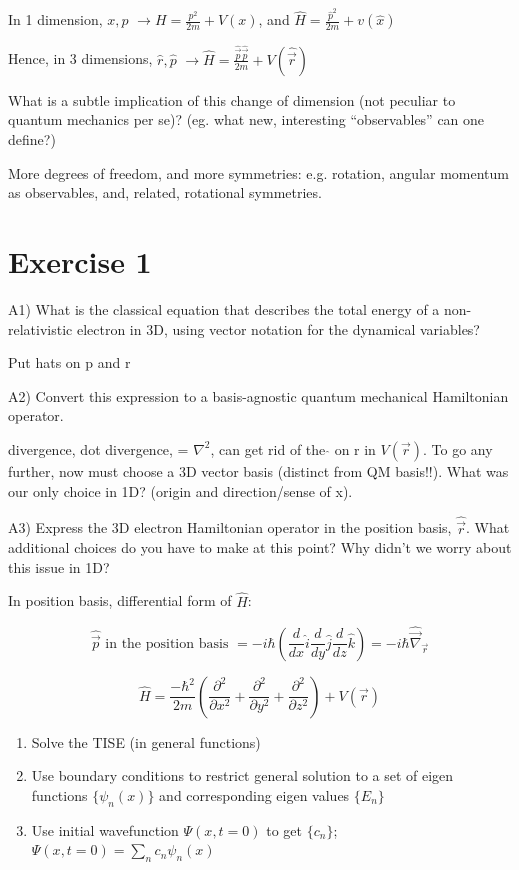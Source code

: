 \documentclass{article}
\begin{document}

In 1 dimension, $x,p$ $\longrightarrow H = \frac{p^2}{2m} + V(x)$, and $\hat{H} = \frac{\hat{p}^2}{2m} + v(\hat{x})$

Hence, in 3 dimensions, $\hat{r}, \hat{p}$ $\longrightarrow \hat{H} = \frac{\hat{\vec{p}} \hat{\vec{p}}}{2m} + V(\hat{\vec{r}})$

What is a subtle implication of this change of dimension (not peculiar to quantum mechanics per se)?  (eg. what new, interesting “observables” can one define?)

More degrees of freedom, and more symmetries: e.g. rotation, angular momentum as observables, and, related, rotational symmetries.  


\section{Exercise 1}

A1) What is the classical equation that describes the total energy of a non-relativistic electron in 3D, using vector notation for the dynamical variables?

Put hats on p and r


A2) Convert this expression to a basis-agnostic quantum mechanical Hamiltonian operator.

divergence, dot divergence, = $\nabla^2$, can get rid of the  $\hat{}$ on r in $V(\vec r)$.  To go any further, now must choose a 3D vector basis (distinct from QM basis!!).  What was our only choice in 1D?  (origin and direction/sense of x).

A3) Express the 3D electron Hamiltonian operator in the position basis, $\hat{\vec{r}}$.  What additional choices do you have to make at this point?  Why didn't we worry about this issue in 1D?

In position basis, differential form of $\hat{H}$:

$$\hat{\vec{p}} \text{ in the position basis } = -i \hbar \left( \frac{d}{dx} \hat{i} \frac{d}{dy} \hat{j} \frac{d}{dz} \hat{k} \right) = -i \hbar \hat{\vec{\nabla}}_{\vec{r}}$$

$$\hat{H} = \frac{-\hbar^2}{2m} \left( \frac{\partial^2}{\partial x^2} + \frac{\partial^2}{\partial y^2} + \frac{\partial^2}{\partial z^2} \right) + V(\vec{r})$$

\begin{enumerate}
    \item Solve the TISE (in general functions)
    \item Use boundary conditions to restrict general solution to a set of eigen functions $\{\psi_n(x)\}$ and corresponding eigen values $\{E_n\}$
    \item Use initial wavefunction $\Psi(x,t=0)$ to get $\{c_n\}$; $\Psi(x,t=0) = \sum_n c_n \psi_n(x)$
\end{enumerate}
\end{document}
